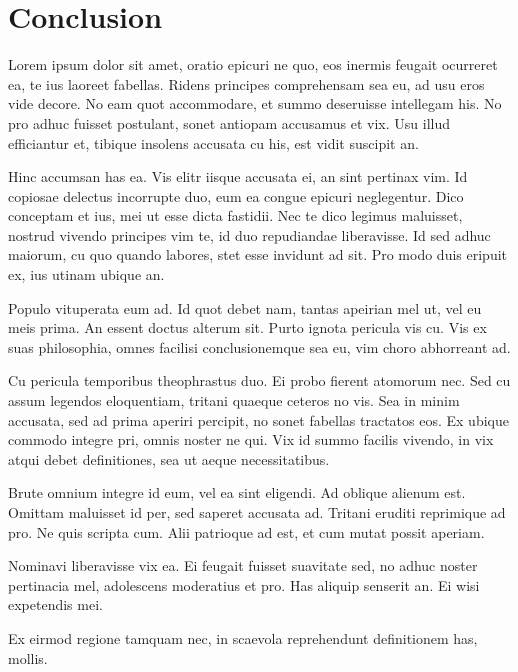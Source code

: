 
\chapter{Conclusion}

Lorem ipsum dolor sit amet, oratio epicuri ne quo, eos inermis feugait ocurreret ea, te ius laoreet fabellas. Ridens principes comprehensam sea eu, ad usu eros vide decore. No eam quot accommodare, et summo deseruisse intellegam his. No pro adhuc fuisset postulant, sonet antiopam accusamus et vix. Usu illud efficiantur et, tibique insolens accusata cu his, est vidit suscipit an.

Hinc accumsan has ea. Vis elitr iisque accusata ei, an sint pertinax vim. Id copiosae delectus incorrupte duo, eum ea congue epicuri neglegentur. Dico conceptam et ius, mei ut esse dicta fastidii. Nec te dico legimus maluisset, nostrud vivendo principes vim te, id duo repudiandae liberavisse. Id sed adhuc maiorum, cu quo quando labores, stet esse invidunt ad sit. Pro modo duis eripuit ex, ius utinam ubique an.

Populo vituperata eum ad. Id quot debet nam, tantas apeirian mel ut, vel eu meis prima. An essent doctus alterum sit. Purto ignota pericula vis cu. Vis ex suas philosophia, omnes facilisi conclusionemque sea eu, vim choro abhorreant ad.

Cu pericula temporibus theophrastus duo. Ei probo fierent atomorum nec. Sed cu assum legendos eloquentiam, tritani quaeque ceteros no vis. Sea in minim accusata, sed ad prima aperiri percipit, no sonet fabellas tractatos eos. Ex ubique commodo integre pri, omnis noster ne qui. Vix id summo facilis vivendo, in vix atqui debet definitiones, sea ut aeque necessitatibus.

Brute omnium integre id eum, vel ea sint eligendi. Ad oblique alienum est. Omittam maluisset id per, sed saperet accusata ad. Tritani eruditi reprimique ad pro. Ne quis scripta cum. Alii patrioque ad est, et cum mutat possit aperiam.

Nominavi liberavisse vix ea. Ei feugait fuisset suavitate sed, no adhuc noster pertinacia mel, adolescens moderatius et pro. Has aliquip senserit an. Ei wisi expetendis mei.

Ex eirmod regione tamquam nec, in scaevola reprehendunt definitionem has, mollis.